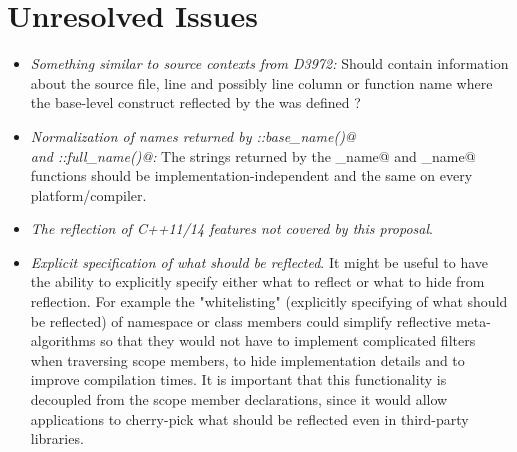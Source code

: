 \section{Unresolved Issues}
\label{section-issues}

\begin{itemize}
	\item {\em Something similar to source contexts from D3972:} Should {} contain information
	about the source file, line and possibly line column or function name where the base-level construct
	reflected by the {} was defined ?

	\item {\em Normalization of names returned by \verb@Named::base_name()@\\and \verb@NamedScoped::full_name()@:}
	The strings returned by the \verb@base_name@ and \verb@full_name@ functions should be
	implementation-independent and the same on every platform/compiler.


	\item {\em The reflection of C++11/14 features not covered by this proposal}.


	\item {\em Explicit specification of what should be reflected}. It might be useful to have
	the ability to explicitly specify either what to reflect or what to hide from reflection.
	For example the "whitelisting" (explicitly specifying of what should be reflected) of namespace
	or class members could simplify reflective meta-algorithms so that they would not have
	to implement complicated filters when traversing scope members, to hide implementation details and
	to improve compilation times. It is important that this functionality is decoupled from the
	scope member declarations, since it would allow applications to cherry-pick what should be
	reflected even in third-party libraries.
\end{itemize}
